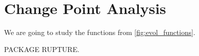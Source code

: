 \chapter{Change Point Analysis}
\label{chap:change_point}

We are going to study the functions from \ref{fig:evol_functions}.

PACKAGE RUPTURE.




